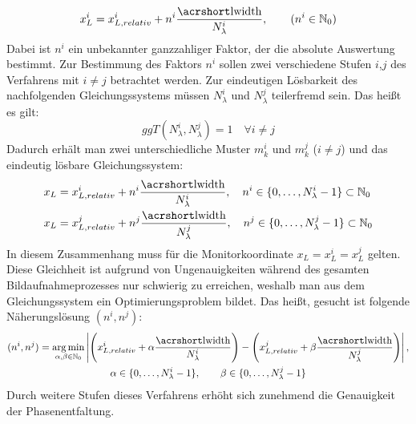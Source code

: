 %
\begin{equation}\label{eq:registrierungX_absolut}
	x_L^i = x_{L,relativ}^i + n^i \dfrac{\acrshortmath{lwidth}}{N_\lambda^i},
	\qquad
	(n^i \in \mathbb{N}_0)
\end{equation}
%
Dabei ist $n^i$ ein unbekannter ganzzahliger Faktor, der die absolute Auswertung bestimmt.
Zur Bestimmung des Faktors $n^i$ sollen zwei verschiedene Stufen $i$,$j$ des Verfahrens mit $i \neq j$ betrachtet werden.
Zur eindeutigen Lösbarkeit des nachfolgenden Gleichungssystems müssen $N_\lambda^i$ und $N_\lambda^j$ teilerfremd sein.
Das heißt es gilt:
%
\begin{equation*}
	ggT(N_\lambda^i, N_\lambda^j) = 1
	\quad
	\forall i \neq j
\end{equation*}
%
Dadurch erhält man zwei unterschiedliche Muster $m_k^i$ und $m_k^j$ ($i \neq j$) und das eindeutig lösbare Gleichungssystem:
%
\begin{equation}\label{eq:gleichungssystemRegistrierung}
	\begin{split}
		x_L & = x_{L,relativ}^i + n^i \dfrac{\acrshortmath{lwidth}}{N_\lambda^i},
		\quad n^i \in \lbrace 0,\ldots, N_\lambda^i - 1 \rbrace \subset \mathbb{N}_0\\
		x_L & = x_{L,relativ}^j + n^j \dfrac{\acrshortmath{lwidth}}{N_\lambda^j},
		\quad n^j \in \lbrace 0,\ldots, N_\lambda^j - 1 \rbrace \subset \mathbb{N}_0
	\end{split}
\end{equation}
%
In diesem Zusammenhang muss für die Monitorkoordinate $x_L = x_L^i = x_L^j$ gelten.
Diese Gleichheit ist aufgrund von Ungenauigkeiten während des gesamten Bildaufnahmeprozesses nur schwierig zu erreichen, weshalb man aus dem Gleichungssystem ein Optimierungsproblem bildet.
Das heißt, gesucht ist folgende Näherungslösung $(n^i, n^j)$:
%
\begin{equation}\label{eq:optimierungsProblem_zweiStufen}
	\begin{gathered}	
		(n^i, n^j) = \argmin_{\alpha, \beta \in \mathbb{N}_0}
		\left\lvert
			\Bigg(
				x_{L,relativ}^i + \alpha \dfrac{\acrshortmath{lwidth}}{N_\lambda^i}
			\Bigg)
			-
			\Bigg(		
				x_{L,relativ}^j + \beta \dfrac{\acrshortmath{lwidth}}{N_\lambda^j}
			\Bigg)
		\right\rvert,\\
		\alpha \in \lbrace 0,\ldots, N_\lambda^i - 1\rbrace,
		\qquad
		\beta \in \lbrace 0,\ldots, N_\lambda^j - 1\rbrace
	\end{gathered}
\end{equation}
%
Durch weitere Stufen dieses Verfahrens erhöht sich zunehmend die Genauigkeit der Phasenentfaltung.
